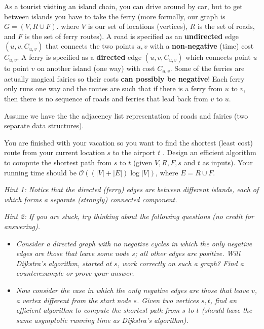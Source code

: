 \documentclass{article}\usepackage[utf8]{inputenc}
\begin{document}
\noindent As a tourist visiting an island chain, you can drive around by car, but to get between islands you have to take the ferry (more formally, our graph is $G=(V,R\cup F)$. where $V$ is our set of locations (vertices), $R$ is the set of roads, and $F$ is the set of ferry routes). A road is specified as an \textbf{undirected} edge $(u,v,C_{u,v})$ that connects the two points $u,v$ with a \textbf{non-negative} (time) cost $C_{u,v}$. A ferry is specified as a \textbf{directed} edge $(u,v,C_{u,v})$ which connects point $u$ to point $v$ on another island (one way) with cost $C_{u,v}$. Some of the ferries are actually magical fairies so their costs \textbf{can possibly be negative}! Each ferry only runs one way and the routes are such that if there is a ferry from $u$ to $v$, then there is no sequence of roads and ferries that lead back from $v$ to $u$.

\vspace{3pt}
\noindent Assume we have the the adjacency list representation of roads and fairies (two separate data structures).

\vspace{3pt}
\noindent You are finished with your vacation so you want to find the shortest (least cost) route from your current location $s$ to the airport $t$ . Design an efficient algorithm to compute the shortest path from $s$ to $t$ (given $V , R, F, s$ and $t$ as inputs). Your running time should be $\mathcal{O}((|V|+|E|)\log{|V|})$, where $E=R\cup F$.

\vspace{3pt}
\noindent \textit{Hint 1: Notice that the directed (ferry) edges are between different islands, each of which forms a separate (strongly) connected component.}

\vspace{3pt}
\noindent \textit{Hint 2: If you are stuck, try thinking about the following questions (no credit for answering).}
\begin{itemize}
\item \textit{Consider a directed graph with no negative cycles in which the only negative edges are those that leave some node $s$; all other edges are positive. Will Dijkstra's algorithm, started at $s$, work correctly on such a graph? Find a counterexample or prove your answer.}
\item \textit{Now consider the case in which the only negative edges are those that leave $v$, a vertex different from the start node $s$. Given two vertices $s,t$, find an efficient algorithm to compute the shortest path from $s$ to $t$ (should have the same asymptotic running time as Dijkstra's algorithm).}
\end{itemize}
\BeginSolution %
\end{document}
